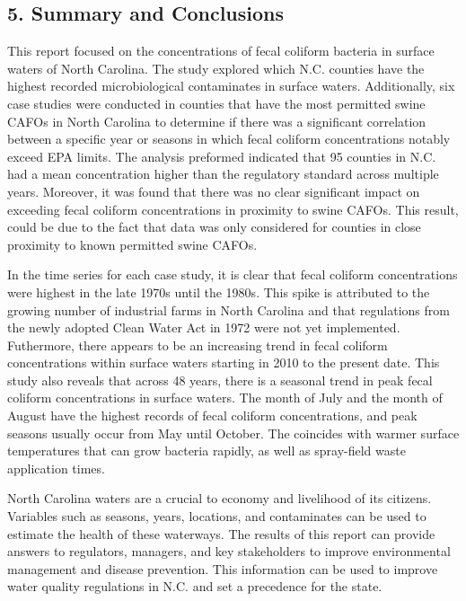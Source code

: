 \documentclass[12pt,]{article}
\begin{document}
\newpage

\hypertarget{summary-and-conclusions}{%
\subsection{5. Summary and Conclusions}\label{summary-and-conclusions}}

This report focused on the concentrations of fecal coliform bacteria in
surface waters of North Carolina. The study explored which N.C. counties
have the highest recorded microbiological contaminates in surface
waters. Additionally, six case studies were conducted in counties that
have the most permitted swine CAFOs in North Carolina to determine if
there was a significant correlation between a specific year or seasons
in which fecal coliform concentrations notably exceed EPA limits. The
analysis preformed indicated that 95 counties in N.C. had a mean
concentration higher than the regulatory standard across multiple years.
Moreover, it was found that there was no clear significant impact on
exceeding fecal coliform concentrations in proximity to swine CAFOs.
This result, could be due to the fact that data was only considered for
counties in close proximity to known permitted swine CAFOs.

In the time series for each case study, it is clear that fecal coliform
concentrations were highest in the late 1970s until the 1980s. This
spike is attributed to the growing number of industrial farms in North
Carolina and that regulations from the newly adopted Clean Water Act in
1972 were not yet implemented. Futhermore, there appears to be an
increasing trend in fecal coliform concentrations within surface waters
starting in 2010 to the present date. This study also reveals that
across 48 years, there is a seasonal trend in peak fecal coliform
concentrations in surface waters. The month of July and the month of
August have the highest records of fecal coliform concentrations, and
peak seasons usually occur from May until October. The coincides with
warmer surface temperatures that can grow bacteria rapidly, as well as
spray-field waste application times.

North Carolina waters are a crucial to economy and livelihood of its
citizens. Variables such as seasons, years, locations, and contaminates
can be used to estimate the health of these waterways. The results of
this report can provide answers to regulators, managers, and key
stakeholders to improve environmental management and disease prevention.
This information can be used to improve water quality regulations in
N.C. and set a precedence for the state. \newpage
\end{document}
